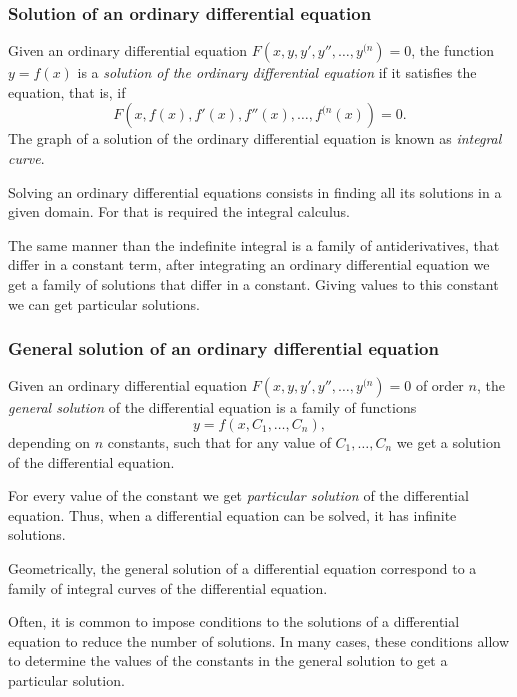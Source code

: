 \begin{frame}
\frametitle{Solution of an ordinary differential equation}
\begin{definition}
Given an ordinary differential equation $F(x,y,y',y'',\ldots,y^{(n})=0$, the function $y=f(x)$ is a \emph{solution of the ordinary differential equation} if it satisfies the equation, that is, if
\[
F(x,f(x), f'(x), f''(x),\ldots, f^{(n}(x))=0.
\]
The graph of a solution of the ordinary differential equation is known as \emph{integral curve}.
\end{definition}

Solving an ordinary differential equations consists in finding all its solutions in a given domain. 
For that is required the integral calculus. 

The same manner than the indefinite integral is a family of antiderivatives, that differ in a constant term, after integrating an ordinary differential equation we get a family of solutions that differ in a constant.
Giving values to this constant we can get particular solutions. 
\end{frame}


\begin{frame}
\frametitle{General solution of an ordinary differential equation}
\begin{definition}
Given an ordinary differential equation $F(x,y,y',y'',\ldots,y^{(n})=0$ of order $n$, the \emph{general solution} of the differential equation is a family of functions 
\[y =f (x,C_1,\ldots,C_n),\] 
depending on $n$ constants, such that for any value of $C_1,\ldots,C_n$ we get a solution of the differential equation. 
\end{definition}

For every value of the constant we get \emph{particular solution} of the differential equation.
Thus, when a differential equation can be solved, it has infinite solutions.

Geometrically, the general solution of a differential equation correspond to a family of integral curves of the differential equation.

Often, it is common to impose conditions to the solutions of a differential equation to reduce the number of solutions. 
In many cases, these conditions allow to determine the values of the constants in the general solution to get a particular solution.
\end{frame}


